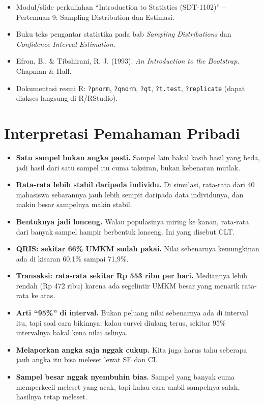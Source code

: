 \documentclass[
  indonesian,
  letterpaper,
]{book}
\providecommand{\tightlist}{%
  \setlength{\itemsep}{0pt}\setlength{\parskip}{0pt}}
\begin{document}
\begin{itemize}
\tightlist
\item
  Modul/slide perkuliahan ``Introduction to Statistics (SDT-1102)'' --
  Pertemuan 9: Sampling Distribution dan Estimasi.
\item
  Buku teks pengantar statistika pada bab \emph{Sampling Distributions}
  dan \emph{Confidence Interval Estimation}.
\item
  Efron, B., \& Tibshirani, R. J. (1993). \emph{An Introduction to the
  Bootstrap}. Chapman \& Hall.
\item
  Dokumentasi resmi R: \texttt{?pnorm}, \texttt{?qnorm}, \texttt{?qt},
  \texttt{?t.test}, \texttt{?replicate} (dapat diakses langsung di
  R/RStudio).
\end{itemize}

\section{Interpretasi Pemahaman
Pribadi}\label{interpretasi-pemahaman-pribadi}

\begin{itemize}
\tightlist
\item
  \textbf{Satu sampel bukan angka pasti.} Sampel lain bakal kasih hasil
  yang beda, jadi hasil dari satu sampel itu cuma taksiran, bukan
  kebenaran mutlak.
\item
  \textbf{Rata-rata lebih stabil daripada individu.} Di simulasi,
  rata-rata dari 40 mahasiswa sebarannya jauh lebih sempit daripada data
  individunya, dan makin besar sampelnya makin stabil.
\item
  \textbf{Bentuknya jadi lonceng.} Walau populasinya miring ke kanan,
  rata-rata dari banyak sampel hampir berbentuk lonceng. Ini yang
  disebut CLT.
\item
  \textbf{QRIS: sekitar 66\% UMKM sudah pakai.} Nilai sebenarnya
  kemungkinan ada di kisaran 60,1\% sampai 71,9\%.
\item
  \textbf{Transaksi: rata-rata sekitar Rp 553 ribu per hari.} Mediannya
  lebih rendah (Rp 472 ribu) karena ada segelintir UMKM besar yang
  menarik rata-rata ke atas.
\item
  \textbf{Arti ``95\%'' di interval.} Bukan peluang nilai sebenarnya ada
  di interval itu, tapi soal cara bikinnya: kalau survei diulang terus,
  sekitar 95\% intervalnya bakal kena nilai aslinya.
\item
  \textbf{Melaporkan angka saja nggak cukup.} Kita juga harus tahu
  seberapa jauh angka itu bisa meleset lewat SE dan CI.
\item
  \textbf{Sampel besar nggak nyembuhin bias.} Sampel yang banyak cuma
  memperkecil meleset yang acak, tapi kalau cara ambil sampelnya salah,
  hasilnya tetap meleset.
\end{itemize}
\end{document}
